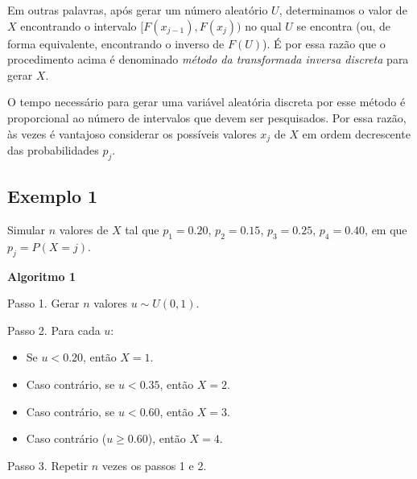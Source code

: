 \documentclass[
  letterpaper,
  DIV=11,
  numbers=noendperiod]{scrreprt}
\begin{document}
Em outras palavras, após gerar um número aleatório \(U\), determinamos o
valor de \(X\) encontrando o intervalo \([F(x_{j-1}), F(x_j))\) no qual
\(U\) se encontra (ou, de forma equivalente, encontrando o inverso de
\(F(U)\)). É por essa razão que o procedimento acima é denominado
\emph{método da transformada inversa discreta} para gerar \(X\).

\begin{tcolorbox}[enhanced jigsaw, coltitle=black, bottomtitle=1mm, toprule=.15mm, arc=.35mm, colframe=quarto-callout-note-color-frame, breakable, opacityback=0, bottomrule=.15mm, rightrule=.15mm, titlerule=0mm, toptitle=1mm, title=\textcolor{quarto-callout-note-color}{\faInfo}\hspace{0.5em}{Nota}, leftrule=.75mm, opacitybacktitle=0.6, left=2mm, colback=white, colbacktitle=quarto-callout-note-color!10!white]

O tempo necessário para gerar uma variável aleatória discreta por esse
método é proporcional ao número de intervalos que devem ser pesquisados.
Por essa razão, às vezes é vantajoso considerar os possíveis valores
\(x_j\) de \(X\) em ordem decrescente das probabilidades \(p_j\).

\end{tcolorbox}

\subsection*{Exemplo 1}\label{exemplo-1}

Simular \(n\) valores de \(X\) tal que \(p_1 = 0.20\), \(p_2 = 0.15\),
\(p_3 = 0.25\), \(p_4 = 0.40\), em que \(p_j = P(X=j)\).

\begin{tcolorbox}[enhanced jigsaw, toprule=.15mm, arc=.35mm, colframe=quarto-callout-warning-color-frame, breakable, opacityback=0, rightrule=.15mm, bottomrule=.15mm, left=2mm, leftrule=.75mm, colback=white]

\vspace{-3mm}\textbf{Algoritmo 1}\vspace{3mm}

Passo 1. Gerar \(n\) valores \(u \sim U(0,1)\).

Passo 2. Para cada \(u\):

\begin{itemize}
\item
  Se \(u < 0.20\), então \(X = 1\).
\item
  Caso contrário, se \(u < 0.35\), então \(X = 2\).
\item
  Caso contrário, se \(u < 0.60\), então \(X = 3\).
\item
  Caso contrário (\(u \geq 0.60\)), então \(X = 4\).
\end{itemize}

Passo 3. Repetir \(n\) vezes os passos 1 e 2.

\end{tcolorbox}
\end{document}
